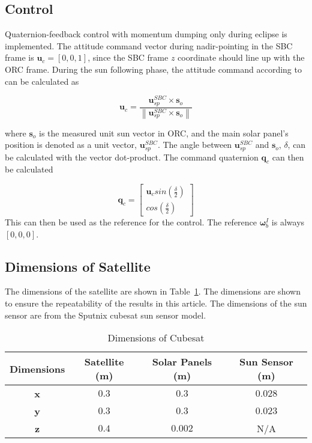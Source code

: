 \documentclass[letterpaper, 10 pt, conference]{ieeeconf}  %
\newcommand\norm[1]{\left\lVert#1\right\rVert}
\begin{document}
\subsection{Control}
Quaternion-feedback control with momentum dumping only during eclipse is implemented. The attitude command vector during nadir-pointing in the SBC frame is $\mathbf{u}_c = [0, 0, 1]$, since the SBC frame $z$ coordinate should line up with the ORC frame. During the sun following phase, the attitude command according to \textcite{chen2000ground} can be calculated as 

\begin{equation}
\mathbf{u}_c = \frac{\mathbf{u}_{sp}^{SBC} \times \mathbf{s}_o}{\norm{\mathbf{u}_{sp}^{SBC} \times \mathbf{s}_o}}
\end{equation}

where $\mathbf{s}_o$ is the measured unit sun vector in ORC, and the main solar panel's position is denoted as a unit vector, $\mathbf{u}_{sp}^{SBC}$. The angle between $\mathbf{u}_{sp}^{SBC}$ and $\mathbf{s}_o$, $\delta$, can be calculated with the vector dot-product. The command quaternion $\mathbf{q}_c$ can then be calculated

\begin{equation}
\mathbf{q}_c = \begin{bmatrix}
	\mathbf{u}_c sin(\frac{\delta}{2}) \\
	cos(\frac{\delta}{2})
\end{bmatrix}
\end{equation}
This can then be used as the reference for the control. The reference $\boldsymbol{\omega}_b^I$ is always $[0, 0, 0]$.

\subsection{Dimensions of Satellite}
The dimensions of the satellite are shown in Table~\ref{Table:Dimensions}. The dimensions are shown to ensure the repeatability of the results in this article. The dimensions of the sun sensor are from the Sputnix cubesat sun sensor model.

\begin{table}[!htb]
	\caption{\label{Table:Dimensions}Dimensions of Cubesat}
	\begin{tabular}{|c|c|c|c|}
		\hline
		\textbf{Dimensions} & \textbf{Satellite (m)} & \textbf{Solar Panels (m)} & \textbf{Sun Sensor (m)} \\ \hline
		\textbf{x}          & $0.3$                    & $0.3$                       & $0.028$                   \\ \hline
		\textbf{y}          & $0.3$                    & $0.3$                       & $0.023$                   \\ \hline
		\textbf{z}          & $0.4$                    & $0.002$                     & N/A                     \\ \hline
	\end{tabular}
\end{table}
\end{document}
